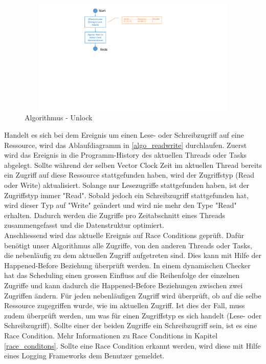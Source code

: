 \documentclass[10pt,a4paper]{article}
\begin{document}
\begin{figure}[H]
\centering
	\includegraphics[width=12cm,height=5.5cm,trim=70mm 106mm 100mm 8mm, clip]{images/Unlock.pdf}
\caption{Algorithmus - Unlock}\label{algo_unlock}
\end{figure}
Handelt es sich bei dem Ereignis um einen Lese- oder Schreibzugriff auf eine Ressource, wird das Ablaufdiagramm in \autoref{algo_readwrite} durchlaufen. Zuerst wird das Ereignis in die Programm-History des aktuellen Threads oder Tasks abgelegt. Sollte während der selben Vector Clock Zeit im aktuellen Thread bereits ein Zugriff auf diese Ressource stattgefunden haben, wird der Zugriffstyp (Read oder Write) aktualisiert. Solange nur Lesezugriffe stattgefunden haben, ist der Zugriffstyp immer "Read". Sobald jedoch ein Schreibzugriff stattgefunden hat, wird dieser Typ auf "Write" geändert und wird nie mehr den Type "Read" erhalten. Dadurch werden die Zugriffe pro Zeitabschnitt eines Threads zusammengefasst und die Datenstruktur optimiert.\\
Anschliessend wird das aktuelle Ereignis auf Race Conditions geprüft. Dafür benötigt unser Algorithmus alle Zugriffe, von den anderen Threads oder Tasks, die nebenläufig zu dem aktuellen Zugriff aufgetreten sind. Dies kann mit Hilfe der Happened-Before Beziehung überprüft werden. In einem dynamischen Checker hat das Scheduling einen grossen Einfluss auf die Reihenfolge der einzelnen Zugriffe und kann dadurch die Happened-Before Beziehungen zwischen zwei Zugriffen ändern. Für jeden nebenläufigen Zugriff wird überprüft, ob auf die selbe Ressource zugegriffen wurde, wie im aktuellen Zugriff. Ist dies der Fall, muss zudem überprüft werden, um was für einen Zugriffstyp es sich handelt (Lese- oder Schreibzugriff). Sollte einer der beiden Zugriffe ein Schreibzugriff sein, ist es eine Race Condition. Mehr Informationen zu Race Conditions in Kapitel \ref{race_conditons}. Sollte eine Race Condition erkannt werden, wird diese mit Hilfe eines Logging Frameworks dem Benutzer gemeldet.
\end{document}
